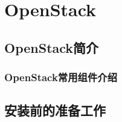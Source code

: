 \chapter{OpenStack}

\section{OpenStack简介}

\subsection{OpenStack常用组件介绍}
\label{sec:opAssemblyIntro}

\section{安装前的准备工作}
\label{sec:opPrepare}


